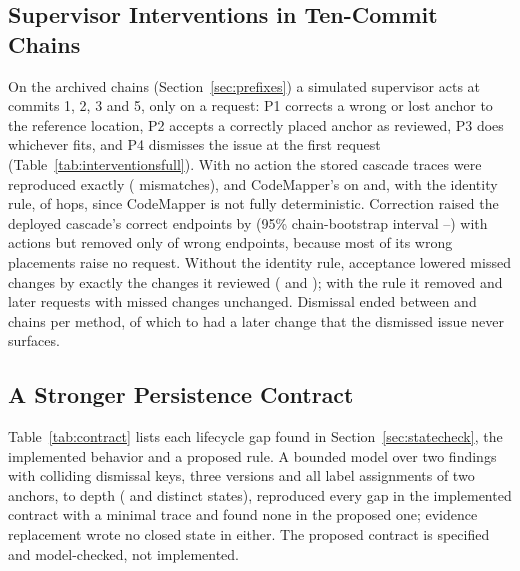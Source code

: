 \subsection{Supervisor Interventions in Ten-Commit Chains}
On the \wvChains{} archived chains (Section~\ref{sec:prefixes}) a simulated supervisor acts at commits 1, 2, 3 and 5, only on a request: P1 corrects a wrong or lost anchor to the reference location, P2 accepts a correctly placed  anchor as reviewed, P3 does whichever fits, and P4 dismisses the issue at the first request (Table~\ref{tab:interventionsfull}). With no action the stored cascade traces were reproduced exactly (\wvGateMismatch{} mismatches), and CodeMapper's on \wvGateCmAgree{} and, with the identity rule, \wvGateCmIdAgree{} of \wvGateCmHops{} hops, since CodeMapper is not fully deterministic. Correction raised the deployed cascade's correct endpoints by \wvDepDPOneCorrectAbs{} (95\% chain-bootstrap interval \wvDepDPOneCorrectAbsLo--\wvDepDPOneCorrectAbsHi) with \wvDepPOneAct{} actions but removed only \wvDepDPOneWrongAbs{} of \wvDepPZeroWrong{} wrong endpoints, because most of its wrong placements raise no request. Without the identity rule, acceptance lowered missed changes by exactly the changes it reviewed (\wvDepDPTwoMissAbs{} and \wvCmDPTwoMissAbs); with the rule it removed \wvDepIdDPTwoReqAbs{} and \wvCmIdDPTwoReqAbs{} later requests with missed changes unchanged. Dismissal ended between \wvDismissedMin{} and \wvDismissedMax{} chains per method, of which \wvDismissedChangedMin{} to \wvDismissedChangedMax{} had a later change that the dismissed issue never surfaces.

\subsection{A Stronger Persistence Contract}
Table~\ref{tab:contract} lists each lifecycle gap found in Section~\ref{sec:statecheck}, the implemented behavior and a proposed rule. A bounded model over two findings with colliding dismissal keys, three versions and all label assignments of two anchors, to depth \wcDepth{} (\wcStatesImpl{} and \wcStatesStrong{} distinct states), reproduced every gap in the implemented contract with a minimal trace and found none in the proposed one; evidence replacement wrote no closed state in either. The proposed contract is specified and model-checked, not implemented.
